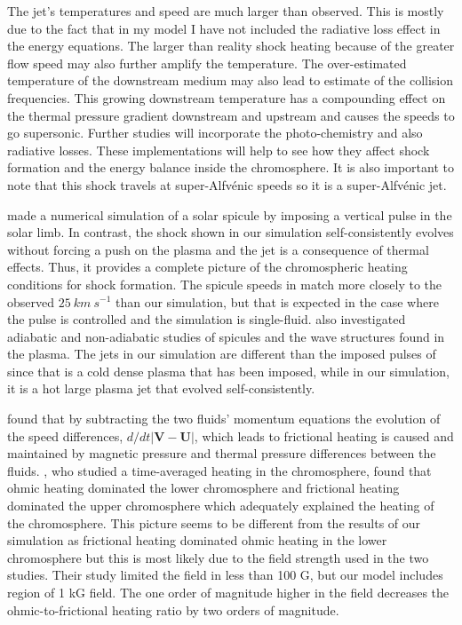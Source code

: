 \documentclass[12pt,upcase]{umlthesis}
\begin{document}
The jet's temperatures and speed are much larger than observed. This is mostly due to the fact that in my model I have not included the radiative loss effect in the energy equations. The larger than reality shock heating because of the greater flow speed may also further amplify the temperature. The over-estimated temperature of the downstream medium may also lead to estimate of the collision frequencies. This growing downstream temperature has a compounding effect on the thermal pressure gradient downstream and upstream and causes the speeds to go supersonic. Further studies will incorporate the photo-chemistry and also radiative losses. These implementations will help to see how they affect shock formation and the energy balance inside the chromosphere. It is also important to note that this shock travels at super-Alfv\'enic speeds so it is a super-Alfv\'enic jet.

\citet{KuzmaApJ2017} made a numerical simulation of a solar spicule by imposing a vertical pulse in the solar limb. In contrast, the shock shown in our simulation self-consistently evolves without forcing a push on the plasma and the jet is a consequence of thermal effects. Thus, it provides a complete picture of the chromospheric heating conditions for shock formation. The spicule speeds in \citet{KuzmaApJ2017} match more closely to the observed $25~km~s^{-1}$ than our simulation, but that is expected in the case where the pulse is controlled and the simulation is single-fluid. \citet{KuzmaApJ2017} also investigated adiabatic and non-adiabatic studies of spicules and the wave structures found in the plasma. The jets in our simulation are different than the imposed pulses of~\citet{Kuzma2017} since that is a cold dense plasma that has been imposed, while in our simulation, it is a hot large plasma jet that evolved self-consistently.

\citet{Song2014} found that by subtracting the two fluids' momentum equations the evolution of the speed differences, $d/dt|\textbf{V}-\textbf{U}|$, which leads to frictional heating is caused and maintained by magnetic pressure and thermal pressure differences between the fluids. \citet{Tu2013}, who studied a time-averaged heating in the chromosphere, found that ohmic heating dominated the lower chromosphere and frictional heating dominated the upper chromosphere which adequately explained the heating of the chromosphere. This picture seems to be different from the results of our simulation as frictional heating dominated ohmic heating in the lower chromosphere but this is most likely due to the field strength used in the two studies. Their study limited the field in less than 100 G, but our model includes region of 1 kG field. The one order of magnitude higher in the field decreases the ohmic-to-frictional heating ratio by two orders of magnitude.
\end{document}
